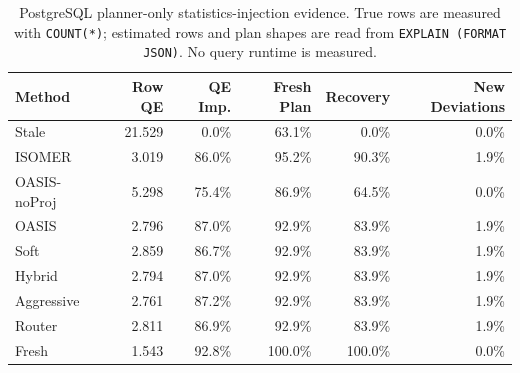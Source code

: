 \begin{table}[t]
  \centering
  \small
  \caption{PostgreSQL planner-only statistics-injection evidence. True rows are measured with \texttt{COUNT(*)}; estimated rows and plan shapes are read from \texttt{EXPLAIN (FORMAT JSON)}. No query runtime is measured.}
  \label{tab:postgres_planner_stats_injection}
  \setlength{\tabcolsep}{4pt}
  \begin{tabular}{lrrrrr}
    \toprule
    Method & Row QE & QE Imp. & Fresh Plan & Recovery & New Deviations \\
    \midrule
    Stale & 21.529 & 0.0\% & 63.1\% & 0.0\% & 0.0\% \\
    ISOMER & 3.019 & 86.0\% & 95.2\% & 90.3\% & 1.9\% \\
    OASIS-noProj & 5.298 & 75.4\% & 86.9\% & 64.5\% & 0.0\% \\
    OASIS & 2.796 & 87.0\% & 92.9\% & 83.9\% & 1.9\% \\
    Soft & 2.859 & 86.7\% & 92.9\% & 83.9\% & 1.9\% \\
    Hybrid & 2.794 & 87.0\% & 92.9\% & 83.9\% & 1.9\% \\
    Aggressive & 2.761 & 87.2\% & 92.9\% & 83.9\% & 1.9\% \\
    Router & 2.811 & 86.9\% & 92.9\% & 83.9\% & 1.9\% \\
    Fresh & 1.543 & 92.8\% & 100.0\% & 100.0\% & 0.0\% \\
    \bottomrule
  \end{tabular}
\end{table}
